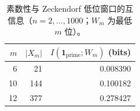 \begin{table}[H]
\centering
\scriptsize
\setlength{\tabcolsep}{6pt}
\caption{素数性与 Zeckendorf 低位窗口的互信息（$n=2,\dots,1000$；$W_m$ 为最低 $m$ 位）。}
\label{tab:prime_shadow_window_mi}
\begin{tabular}{r r r}
\toprule
$m$ & $|X_m|$ & $I(\mathbf{1}_{\mathrm{prime}};W_m)$ (bits)\\
\midrule
6 & 21 & 0.008390\\
10 & 144 & 0.100182\\
12 & 377 & 0.278427\\
\bottomrule
\end{tabular}
\end{table}
